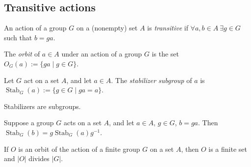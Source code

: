 \subsection{Transitive actions}
\label{subsec:groups:transitive-actions-and-the-category-g-set}

\begin{definition}
  \label{def:groups:transitive-action}
  \leanok
  An action of a group $G$ on a (nonempty) set $A$ is \emph{transitive}
  if $\forall a, b \in A\ \exists g \in G$ such that $b = ga$.
\end{definition}

\begin{definition}
  \label{def:groups:orbit}
  \leanok
  The \emph{orbit} of $a \in A$ under an action of a group $G$ is the
  set $O_G(a) := \{ga \mid g \in G\}$.
\end{definition}

\begin{definition}
  \label{def:groups:stabilizer}
  \leanok
  Let $G$ act on a set $A$, and let $a \in A$. The \emph{stabilizer
  subgroup} of $a$ is $\operatorname{Stab}_G(a) := \{g \in G \mid ga
  = a\}$.
\end{definition}

\begin{proposition}
  \label{prop:groups:stabilizers-are-subgroups}
  Stabilizers are subgroups.
\end{proposition}

\begin{proposition}
  \label{prop:groups:stabilizer-conjugation}
  Suppose a group $G$ acts on a set $A$, and let $a \in A$, $g \in G$,
  $b = ga$. Then $\operatorname{Stab}_G(b) =
  g\operatorname{Stab}_G(a)g^{-1}$.
\end{proposition}

\begin{corollary}
  \label{coro:groups:orbit-divides-order}
  If $O$ is an orbit of the action of a finite group $G$ on a set
  $A$, then $O$ is a finite set and $|O|$ divides $|G|$.
\end{corollary}

